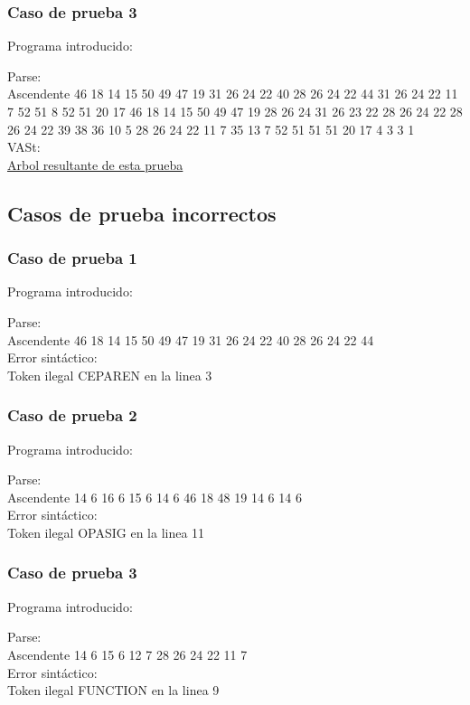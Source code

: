 \documentclass[12pt, a4paper, titlepage]{article}
\begin{document}
\subsubsection{Caso de prueba 3}
\label{subsec:correcto3}
\begin{center}
  Programa introducido:
  
  Parse: \\
  Ascendente 46 18 14 15 50 49 47 19 31 26 24 22 40 28 26 24 22 44 31 26 24 22 11 7 52 51 8 52 51 20 17 46 18 14 15 50 49 47 19 28 26 24 31 26 23 22 28 26 24 22 28 26 24 22 39 38 36 10 5 28 26 24 22 11 7 35 13 7 52 51 51 51 20 17 4 3 3 1 \\
  VASt: \\
  \href{run:./Arbol3.pdf}{Arbol resultante de esta prueba} 
\end{center}
\clearpage

\subsection{Casos de prueba incorrectos}
\label{subsec:casosIncorrectos}
\subsubsection{Caso de prueba 1}
\label{subsec:incorrecto1}
\begin{center}
  Programa introducido:
  
  Parse: \\
  Ascendente 46 18 14 15 50 49 47 19 31 26 24 22 40 28 26 24 22 44 \\
  Error sintáctico: \\
  Token ilegal CEPAREN en la linea 3
\end{center}

\subsubsection{Caso de prueba 2}
\label{subsec:incorrecto2}
\begin{center}
  Programa introducido:
  
  Parse: \\
  Ascendente 14 6 16 6 15 6 14 6 46 18 48 19 14 6 14 6 \\
  Error sintáctico: \\
  Token ilegal OPASIG en la linea 11
\end{center}

\subsubsection{Caso de prueba 3}
\label{subsec:incorrecto3}
\begin{center}
  Programa introducido:
  
  Parse: \\
  Ascendente 14 6 15 6 12 7 28 26 24 22 11 7 \\
  Error sintáctico:  \\
  Token ilegal FUNCTION en la linea 9
\end{center}
\end{document}
